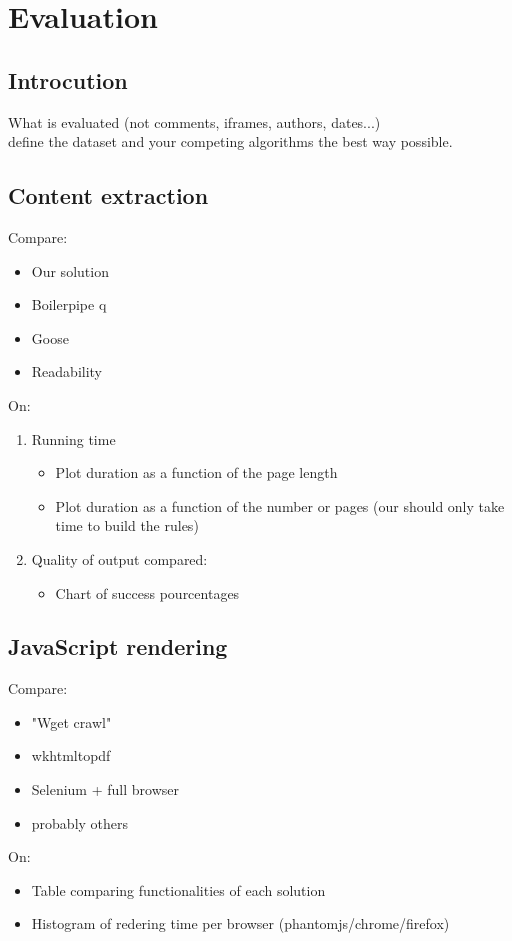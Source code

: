 \section{Evaluation}

\subsection{Introcution}
What is evaluated (not comments, iframes, authors, dates...)
\\ define the dataset and your competing algorithms the best way possible.

\subsection{Content extraction}
Compare:
\begin{itemize}
  \item Our solution
  \item Boilerpipe q
  \item Goose 
  \item Readability 
\end{itemize}
On:
\begin{enumerate}
  \item Running time
  \begin{itemize}
    \item Plot duration as a function of the page length
    \item Plot duration as a function of the number or pages (our should only take time to build the rules)
  \end{itemize}
  \item Quality of output compared:
  \begin{itemize}
    \item Chart of success pourcentages
  \end{itemize}
\end{enumerate}

\subsection{JavaScript rendering}
Compare:
\begin{itemize}
  \item "Wget crawl" 
  \item wkhtmltopdf 
  \item Selenium + full browser
  \item probably others
\end{itemize}
On:
\begin{itemize}
  \item Table comparing functionalities of each solution
  \item Histogram of redering time per browser (phantomjs/chrome/firefox)
\end{itemize}
